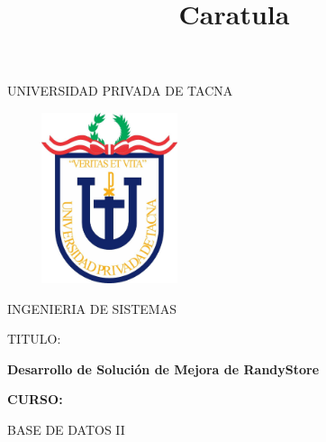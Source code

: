 \documentclass[12pt,letterpaper]{article}
\begin{document}
%


\title{Caratula}

\begin{titlepage}
\begin{center}
\large{UNIVERSIDAD PRIVADA DE TACNA}\\
\vspace*{-0.025in}
\begin{figure}[htb]
\begin{center}

\end{center}
\end{figure}
\begin{center}
    \includegraphics[width=6cm, height=5cm]{img/upt.jpg}  
\end{center}

\vspace*{0.15in}
INGENIERIA DE SISTEMAS  \\

\vspace*{0.5in}
\begin{large}
TITULO:\\
\end{large}

\vspace*{0.1in}
\begin{Large}
\textbf{Desarrollo de Solución de Mejora de RandyStore} \\
\end{Large}

\vspace*{0.3in}
\begin{Large}
\textbf{CURSO:} \\
\end{Large}

\vspace*{0.1in}
\begin{large}
BASE DE DATOS II\\
\end{large}


\end{center}
\end{titlepage}
\end{document}
